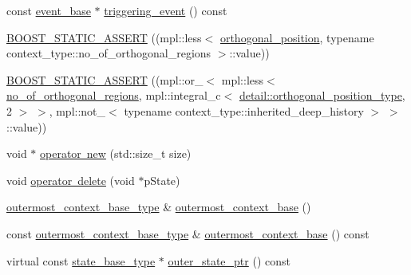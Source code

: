 \begin{DoxyCompactItemize}
\item 
const \mbox{\hyperlink{classboost_1_1statechart_1_1event__base}{event\+\_\+base}} $\ast$ \mbox{\hyperlink{classboost_1_1statechart_1_1simple__state_aa8d3e7109aec6dd3b6b43e21159e2119}{triggering\+\_\+event}} () const
\item 
\mbox{\hyperlink{classboost_1_1statechart_1_1simple__state_a19a11b763b74902e6895452ee41384d7}{B\+O\+O\+S\+T\+\_\+\+S\+T\+A\+T\+I\+C\+\_\+\+A\+S\+S\+E\+RT}} ((mpl\+::less$<$ \mbox{\hyperlink{classboost_1_1statechart_1_1simple__state_af97b00e4ff6f12a1045beb57687cf9bc}{orthogonal\+\_\+position}}, typename context\+\_\+type\+::no\+\_\+of\+\_\+orthogonal\+\_\+regions $>$\+::value))
\item 
\mbox{\hyperlink{classboost_1_1statechart_1_1simple__state_a0218fcd7d5fa8cf04dd00f9f72bd6a4e}{B\+O\+O\+S\+T\+\_\+\+S\+T\+A\+T\+I\+C\+\_\+\+A\+S\+S\+E\+RT}} ((mpl\+::or\+\_\+$<$ mpl\+::less$<$ \mbox{\hyperlink{classboost_1_1statechart_1_1simple__state_abee09a2cb17ed7db5457d3f09bb75f9c}{no\+\_\+of\+\_\+orthogonal\+\_\+regions}}, mpl\+::integral\+\_\+c$<$ \mbox{\hyperlink{namespaceboost_1_1statechart_1_1detail_a3bedea0b807a16fa222733417183d2c9}{detail\+::orthogonal\+\_\+position\+\_\+type}}, 2 $>$ $>$, mpl\+::not\+\_\+$<$ typename context\+\_\+type\+::inherited\+\_\+deep\+\_\+history $>$ $>$\+::value))
\item 
void $\ast$ \mbox{\hyperlink{classboost_1_1statechart_1_1simple__state_a4fbec8248bbcd17578b6746a684e3c9e}{operator new}} (std\+::size\+\_\+t size)
\item 
void \mbox{\hyperlink{classboost_1_1statechart_1_1simple__state_a87840a601ed9b0ff517f3d452e6b13f6}{operator delete}} (void $\ast$p\+State)
\item 
\mbox{\hyperlink{classboost_1_1statechart_1_1simple__state_a50f21d7a7d6632eb34430e74cbad3197}{outermost\+\_\+context\+\_\+base\+\_\+type}} \& \mbox{\hyperlink{classboost_1_1statechart_1_1simple__state_ac542d3d3b03bf646e4f5726259d1a2b0}{outermost\+\_\+context\+\_\+base}} ()
\item 
const \mbox{\hyperlink{classboost_1_1statechart_1_1simple__state_a50f21d7a7d6632eb34430e74cbad3197}{outermost\+\_\+context\+\_\+base\+\_\+type}} \& \mbox{\hyperlink{classboost_1_1statechart_1_1simple__state_ae2d7831022f22363d393f87971507e7c}{outermost\+\_\+context\+\_\+base}} () const
\item 
virtual const \mbox{\hyperlink{classboost_1_1statechart_1_1simple__state_ae4af81f8eae996cc418efa3387af0ef6}{state\+\_\+base\+\_\+type}} $\ast$ \mbox{\hyperlink{classboost_1_1statechart_1_1simple__state_a538172d521f6d6d75e513cd79af79334}{outer\+\_\+state\+\_\+ptr}} () const

\end{DoxyCompactItemize}
